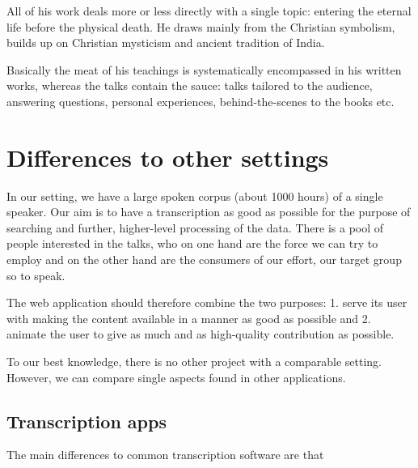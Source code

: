 \documentclass{llncs}
\begin{document}
All of his work deals more or less directly with a single topic: entering the
eternal life before the physical death. He draws mainly from the Christian
symbolism, builds up on Christian mysticism and ancient tradition of India.

Basically the meat of his teachings is systematically encompassed in his written
works, whereas the talks contain the sauce: talks tailored to the audience,
answering questions, personal experiences, behind-the-scenes to the books etc.

\section{Differences to other settings}

In our setting, we have a large spoken corpus (about 1000 hours) of a single
speaker. Our aim is to have a transcription as good as possible for the purpose
of searching and further, higher-level processing of the data. There is a pool
of people interested in the talks, who on one hand are the force we can try to
employ and on the other hand are the consumers of our effort, our target group
so to speak.

The web application should therefore combine the two purposes: 1. serve its user
with making the content available in a manner as good as possible and 2. animate
the user to give as much and as high-quality contribution as possible.

To our best knowledge, there is no other project with a comparable setting.
However, we can compare single aspects found in other applications.

\subsection{Transcription apps}

The main differences to common transcription software are that
\end{document}

